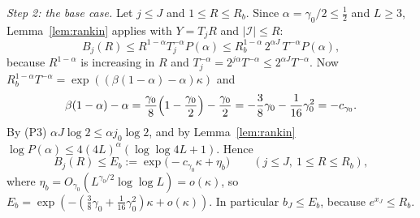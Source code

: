 \medskip\noindent\emph{Step 2: the base case.} Let $j\le J$ and $1\le R\le R_b$. Since $\alpha=\gamma_0/2\le\frac12$ and $L\ge3$, Lemma~\ref{lem:rankin} applies with $Y=T_jR$ and $|\mathcal I|\le R$:
\[
B_j(R)\le R^{1-\alpha}T_j^{-\alpha}P(\alpha)\le R_b^{1-\alpha}\,2^{\alpha J}\,T^{-\alpha}P(\alpha),
\]
because $R^{1-\alpha}$ is increasing in $R$ and $T_j^{-\alpha}=2^{j\alpha}T^{-\alpha}\le2^{\alpha J}T^{-\alpha}$. Now $R_b^{1-\alpha}T^{-\alpha}=\exp((\beta(1-\alpha)-\alpha)\kappa)$ and
\[
\beta(1-\alpha)-\alpha=\frac{\gamma_0}8\Bigl(1-\frac{\gamma_0}2\Bigr)-\frac{\gamma_0}2=-\frac38\gamma_0-\frac1{16}\gamma_0^2=-c_{\gamma_0}.
\]
By (P3) $\alpha J\log2\le\alpha j_0\log2$, and by Lemma~\ref{lem:rankin} $\log P(\alpha)\le4(4L)^\alpha(\log\log4L+1)$. Hence
\begin{equation}\label{eq:div-Eb}
B_j(R)\le E_b:=\exp\bigl(-c_{\gamma_0}\kappa+\eta_b\bigr)\qquad(j\le J,\ 1\le R\le R_b),
\end{equation}
where $\eta_b=O_{\gamma_0}(L^{\gamma_0/2}\log\log L)=o(\kappa)$, so $E_b=\exp(-(\frac38\gamma_0+\frac1{16}\gamma_0^2)\kappa+o(\kappa))$. In particular $b_J\le E_b$, because $e^{x_J}\le R_b$.

